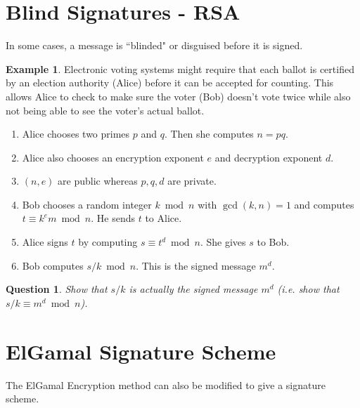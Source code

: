 \documentclass[12pt]{amsart}
\theoremstyle{plain}
\newtheorem{quest}{Question}
\theoremstyle{definition}
\newtheorem*{ex}{Example}
\theoremstyle{remark}
\begin{document}
\newpage
\section{Blind Signatures - RSA}
In some cases, a message is ``blinded" or disguised before it is signed.

\begin{ex}
Electronic voting systems might require that each ballot is certified by an election authority (Alice) before it can be accepted for counting.  This allows Alice to check to make sure the voter (Bob) doesn't vote twice while also not being able to see the voter's actual ballot.
\end{ex}

\begin{framed}
\begin{enumerate}[1.]
	\item Alice chooses two primes $p$ and $q$.  Then she computes $n = pq$.
	\item Alice also chooses an encryption exponent $e$ and decryption exponent $d$.
	\item $(n,e)$ are public whereas $p,q,d$ are private.
	\item Bob chooses a random integer $k \bmod n$ with $\gcd(k,n) = 1$ and computes $t \equiv k^e m \bmod n$.  He sends $t$ to Alice.
	\item Alice signs $t$ by computing $s \equiv t^d \bmod n$.  She gives $s$ to Bob.
	\item Bob computes $s/k \bmod n$.  This is the signed message $m^d.$
\end{enumerate}
\end{framed}

\begin{quest}
Show that $s/k$ is actually the signed message $m^d$ (i.e. show that $s/k \equiv m^d \bmod n$).\\ \vspace{2in}
\end{quest}

\newpage
\section{ElGamal Signature Scheme}
The ElGamal Encryption method can also be modified to give a signature scheme.
\end{document}
